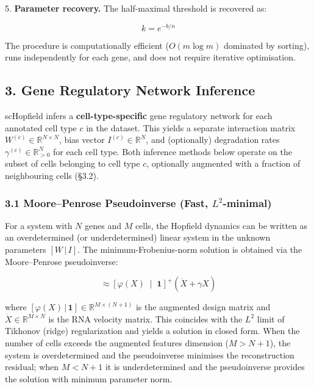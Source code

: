 \documentclass[11pt]{article}
\begin{document}
5. \textbf{Parameter recovery.} The half-maximal threshold is recovered as:

\begin{equation}
k = e^{-b/n} 
\end{equation}


The procedure is computationally efficient ($O(m \log m)$ dominated by sorting), runs independently for each gene, and does not require iterative optimisation.



\subsection*{3. Gene Regulatory Network Inference}

scHopfield infers a \textbf{cell-type-specific} gene regulatory network for each annotated cell type $c$ in the dataset. This yields a separate interaction matrix $W^{(c)} \in \mathbb{R}^{N \times N}$, bias vector $I^{(c)} \in \mathbb{R}^N$, and (optionally) degradation rates $\gamma^{(c)} \in \mathbb{R}^N_{>0}$ for each cell type. Both inference methods below operate on the subset of cells belonging to cell type $c$, optionally augmented with a fraction of neighbouring cells (§3.2).


\subsubsection*{3.1 Moore--Penrose Pseudoinverse (Fast, $L^2$-minimal)}

For a system with $N$ genes and $M$ cells, the Hopfield dynamics can be written as an overdetermined (or underdetermined) linear system in the unknown parameters $[W \,|\, I]$. The minimum-Frobenius-norm solution is obtained via the Moore--Penrose pseudoinverse:


\begin{equation}
[W \;|\; I] \approx \left[\varphi(X) \;\middle|\; \mathbf{1}\right]^{+} \left(\dot{X} + \gamma X\right) 
\end{equation}


where $[\varphi(X) \,|\, \mathbf{1}] \in \mathbb{R}^{M \times (N+1)}$ is the augmented design matrix and $\dot{X} \in \mathbb{R}^{M \times N}$ is the RNA velocity matrix. This coincides with the $L^2$ limit of Tikhonov (ridge) regularization and yields a solution in closed form. When the number of cells exceeds the augmented features dimension ($M > N+1$), the system is overdetermined and the pseudoinverse minimises the reconstruction residual; when $M < N+1$ it is underdetermined and the pseudoinverse provides the solution with minimum parameter norm.
\end{document}
